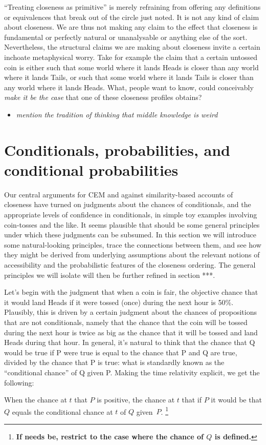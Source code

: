 \documentclass[leqno, 11pt, a5paper, openany]{article}
\begin{document}
“Treating closeness as primitive” is merely refraining from offering any definitions or equivalences that break out of the circle just noted. It is not any kind of claim about closeness. We are thus not making any claim to the effect that closeness is fundamental or perfectly natural or unanalysable or anything else of the sort. Nevertheless, the structural claims we are making about closeness invite a certain inchoate metaphysical worry. Take for example the claim that a certain untossed coin is either such that some world where it lands Heads is closer than any world where it lands Tails, or such that some world where it lands Tails is closer than any world where it lands Heads. What, people want to know, could conceivably \emph{make it be the case} that one of these closeness profiles obtains?

\begin{itemize}
\item
  \emph{mention the tradition of thinking that middle knowledge is weird}
\end{itemize}

\section{Conditionals, probabilities, and conditional probabilities}
\label{conditionals-probabilities-and-conditional-probabilities}
Our central arguments for CEM and against similarity-based accounts of closeness have turned on judgments about the chances of conditionals, and the appropriate levels of confidence in conditionals, in simple toy examples involving coin-tosses and the like. It seems plausible that should be some general principles under which these judgments can be subsumed. In this section we will introduce some natural-looking principles, trace the connections between them, and see how they might be derived from underlying assumptions about the relevant notions of accessibility and the probabilistic features of the closeness ordering. The general principles we will isolate will then be further refined in section ***.

Let's begin with the judgment that when a coin is fair, the objective chance that it would land Heads if it were tossed (once) during the next hour is 50\%. Plausibly, this is driven by a certain judgment about the chances of propositions that are not conditionals, namely that the chance that the coin will be tossed during the next hour is twice as big as the chance that it will be tossed and land Heads during that hour. In general, it's natural to think that the chance that Q would be true if P were true is equal to the chance that P and Q are true, divided by the chance that P is true: what is standardly known as the “conditional chance” of Q given P. Making the time relativity explicit, we get the following:
\begin{prop}
	 \label{chanceq}
	When the chance at $t$ that $P$ is positive, the chance at $t$ that if $P$ it would be that $Q$ equals the conditional chance at $t$ of $Q$ given~$P$.%
	\footnote{\textbf{If needs be, restrict to the case where the chance of $Q$ is defined.}}
\end{prop}
\end{document}
